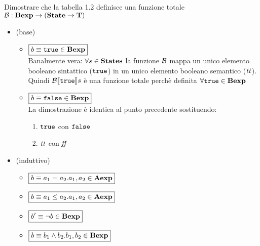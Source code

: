 {Dimostrare che la tabella 1.2 definisce una funzione totale 
$\mathcal{B}: \mbox{\textbf{Bexp}} \rightarrow (\mbox{\textbf{State}} \rightarrow \mbox{\textbf{T}})$}
{
\begin{itemize}

  \item (base)
    \begin{itemize}
      
      \item $\boxed{b \equiv \mbox{\tt true} \in \mbox{\textbf{Bexp}}}$ \\
            Banalmente vera: $\forall s \in \mbox{\textbf{States}}$ la funzione $\mathcal{B}$ mappa 
un unico elemento booleano sintattico ($\mbox{\tt true}$) in un unico elemento 
booleano semantico ($\mbox{\textit{tt}}$). Quindi $\mathcal{B} \llbracket \mbox{\tt true} \rrbracket s$ è una funzione totale 
perchè definita $\forall \mbox{\tt true} \in \mbox{\textbf{Bexp}}$
      
      \item $\boxed{b \equiv \mbox{\tt false} \in \mbox{\textbf{Bexp}}}$ \\
            La dimostrazione è identica al punto precedente sostituendo:
            \begin{enumerate}[label=(\alph*)] 
              \item $\mbox{\tt true}$ con $\mbox{\tt false}$
              \item $\mbox{\textit{tt}}$ con $\mbox{\textit{ff}}$
            \end{enumerate} 
 
    \end{itemize}

  \item (induttivo)
    \begin{itemize}
   
      \item $\boxed{b \equiv a_1 = a_2.a_1,a_2 \in \mbox{\textbf{Aexp}}}$ \\

      \item $\boxed{b \equiv a_1 \leq a_2.a_1,a_2 \in \mbox{\textbf{Aexp}}}$ \\

      \item $\boxed{b' \equiv \lnot b \in \mbox{\textbf{Bexp}}}$ \\

      \item $\boxed{b \equiv b_1 \land b_2.b_1,b_2 \in \mbox{\textbf{Bexp}}}$ \\
   
    \end{itemize}

\end{itemize}  
}
